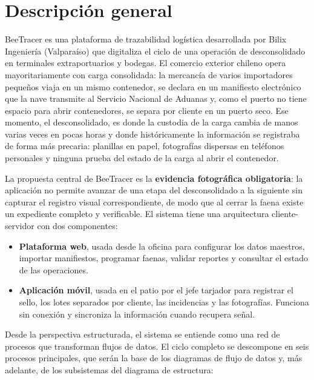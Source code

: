 \chapter{Descripción general}
\label{cap:descripcion}

BeeTracer es una plataforma de trazabilidad logística desarrollada por Bilix Ingeniería
(Valparaíso) que digitaliza el ciclo de una operación de desconsolidado en terminales
extraportuarios y bodegas. El comercio exterior chileno opera mayoritariamente con carga
consolidada: la mercancía de varios importadores pequeños viaja en un mismo contenedor, se
declara en un manifiesto electrónico que la nave transmite al Servicio Nacional de Aduanas y,
como el puerto no tiene espacio para abrir contenedores, se separa por cliente en un puerto
seco. Ese momento, el desconsolidado, es donde la custodia de la carga cambia de manos varias
veces en pocas horas y donde históricamente la información se registraba de forma más
precaria: planillas en papel, fotografías dispersas en teléfonos personales y ninguna prueba
del estado de la carga al abrir el contenedor.

La propuesta central de BeeTracer es la \textbf{evidencia fotográfica obligatoria}: la
aplicación no permite avanzar de una etapa del desconsolidado a la siguiente sin capturar el
registro visual correspondiente, de modo que al cerrar la faena existe un expediente completo y
verificable. El sistema tiene una arquitectura cliente-servidor con dos componentes:

\begin{itemize}
    \item \textbf{Plataforma web}, usada desde la oficina para configurar los datos maestros,
    importar manifiestos, programar faenas, validar reportes y consultar el estado de las
    operaciones.
    \item \textbf{Aplicación móvil}, usada en el patio por el jefe tarjador para registrar el
    sello, los lotes separados por cliente, las incidencias y las fotografías. Funciona sin
    conexión y sincroniza la información cuando recupera señal.
\end{itemize}

Desde la perspectiva estructurada, el sistema se entiende como una red de procesos que
transforman flujos de datos. El ciclo completo se descompone en seis procesos principales,
que serán la base de los diagramas de flujo de datos y, más adelante, de los subsistemas del
diagrama de estructura:

